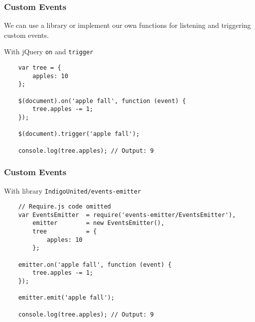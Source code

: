 \begin{frame}[fragile]
  \frametitle{Custom Events}

  We can use a library or implement our own functions for listening and triggering custom events.

  \pause

  \begin{block}{With jQuery \texttt{on} and \texttt{trigger}}
    {\scriptsize
    \begin{verbatim}
    var tree = {
        apples: 10
    };

    $(document).on('apple fall', function (event) {
        tree.apples -= 1;
    });

    $(document).trigger('apple fall');

    console.log(tree.apples); // Output: 9
    \end{verbatim}
    }
  \end{block}
\end{frame}

\begin{frame}[fragile]
  \frametitle{Custom Events}
  \begin{block}{With library \texttt{IndigoUnited/events-emitter}}
    {\scriptsize
    \begin{verbatim}
    // Require.js code omitted
    var EventsEmitter  = require('events-emitter/EventsEmitter'),
        emitter        = new EventsEmitter(),
        tree           = {
            apples: 10
        };

    emitter.on('apple fall', function (event) {
        tree.apples -= 1;
    });

    emitter.emit('apple fall');

    console.log(tree.apples); // Output: 9
    \end{verbatim}
    }
  \end{block}
\end{frame}

